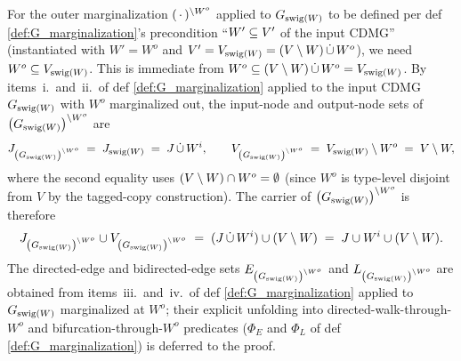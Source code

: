 \documentclass[main]{subfiles}
\begin{document}
\begin{Lem}
\begin{itemize}
              For the outer marginalization $(\,\cdot\,)^{\setminus W^o}$ applied to $G_{\mathrm{swig}(W)}$ to be defined per def \ref{def:G_marginalization}'s precondition ``$W' \subseteq V'$ of the input CDMG'' (instantiated with $W' = W^o$ and $V' = V_{\mathrm{swig}(W)} = (V \setminus W) \,\dot{\cup}\, W^o$), we need $W^o \subseteq V_{\mathrm{swig}(W)}$. This is immediate from $W^o \subseteq (V \setminus W) \,\dot{\cup}\, W^o = V_{\mathrm{swig}(W)}$. By items~i.\ and~ii.\ of def \ref{def:G_marginalization} applied to the input CDMG $G_{\mathrm{swig}(W)}$ with $W^o$ marginalized out, the input-node and output-node sets of $\left ( G_{\mathrm{swig}(W)} \right )^{\setminus W^o}$ are
              \[
                  J_{\left ( G_{\mathrm{swig}(W)} \right )^{\setminus W^o}} \;=\; J_{\mathrm{swig}(W)} \;=\; J \,\dot{\cup}\, W^i,
                  \qquad
                  V_{\left ( G_{\mathrm{swig}(W)} \right )^{\setminus W^o}} \;=\; V_{\mathrm{swig}(W)} \setminus W^o \;=\; V \setminus W,
              \]
              where the second equality uses $(V \setminus W) \cap W^o = \emptyset$ (since $W^o$ is type-level disjoint from $V$ by the tagged-copy construction). The carrier of $\left ( G_{\mathrm{swig}(W)} \right )^{\setminus W^o}$ is therefore
              \[
                  J_{\left ( G_{\mathrm{swig}(W)} \right )^{\setminus W^o}} \cup V_{\left ( G_{\mathrm{swig}(W)} \right )^{\setminus W^o}} \;=\; (J \,\dot{\cup}\, W^i) \cup (V \setminus W) \;=\; J \cup W^i \cup (V \setminus W).
              \]
              The directed-edge and bidirected-edge sets $E_{\left ( G_{\mathrm{swig}(W)} \right )^{\setminus W^o}}$ and $L_{\left ( G_{\mathrm{swig}(W)} \right )^{\setminus W^o}}$ are obtained from items~iii.\ and~iv.\ of def \ref{def:G_marginalization} applied to $G_{\mathrm{swig}(W)}$ marginalized at $W^o$; their explicit unfolding into directed-walk-through-$W^o$ and bifurcation-through-$W^o$ predicates ($\Phi_E$ and $\Phi_L$ of def \ref{def:G_marginalization}) is deferred to the proof.
    \end{itemize}


\end{Lem}
\end{document}
